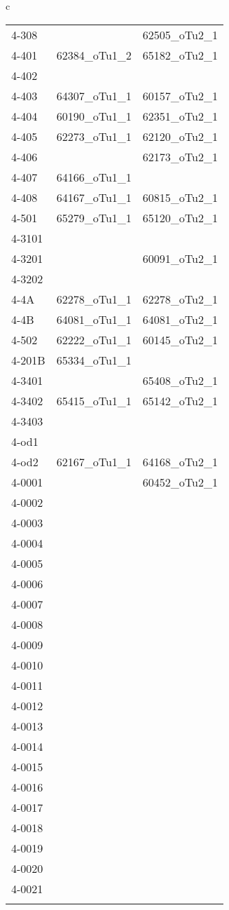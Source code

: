 \begin{table}[htbp]
\begin{center}
\begin{tabular}{c}
{{\begin{minipage}{0.5\hsize}
\begin{center}
\begin{tabular}{lcc}
   4-308 &   & 62505\_oTu2\_1 \\
   4-401 & 62384\_oTu1\_2 & 65182\_oTu2\_1 \\
   4-402 &   &   \\
   4-403 & 64307\_oTu1\_1 & 60157\_oTu2\_1 \\
   4-404 & 60190\_oTu1\_1 & 62351\_oTu2\_1 \\
   4-405 & 62273\_oTu1\_1 & 62120\_oTu2\_1 \\
   4-406 &   & 62173\_oTu2\_1 \\
   4-407 & 64166\_oTu1\_1 &   \\
   4-408 & 64167\_oTu1\_1 & 60815\_oTu2\_1 \\
   4-501 & 65279\_oTu1\_1 & 65120\_oTu2\_1 \\
   4-3101 &   &   \\
   4-3201 &   & 60091\_oTu2\_1 \\
   4-3202 &   &   \\
   4-4A & 62278\_oTu1\_1 & 62278\_oTu2\_1 \\
   4-4B & 64081\_oTu1\_1 & 64081\_oTu2\_1 \\
   4-502 & 62222\_oTu1\_1 & 60145\_oTu2\_1 \\
   4-201B & 65334\_oTu1\_1 &   \\
   4-3401 &   & 65408\_oTu2\_1 \\
   4-3402 & 65415\_oTu1\_1 & 65142\_oTu2\_1 \\
   4-3403 &   &   \\
   4-od1 &   &   \\
   4-od2 & 62167\_oTu1\_1 & 64168\_oTu2\_1 \\
   4-0001 &   & 60452\_oTu2\_1 \\
\if0
   4-0002 &   &   \\
   4-0003 &   &   \\
   4-0004 &   &   \\
   4-0005 &   &   \\
   4-0006 &   &   \\
   4-0007 &   &   \\
   4-0008 &   &   \\
   4-0009 &   &   \\
   4-0010 &   &   \\
   4-0011 &   &   \\
   4-0012 &   &   \\
   4-0013 &   &   \\
   4-0014 &   &   \\
   4-0015 &   &   \\
   4-0016 &   &   \\
   4-0017 &   &   \\
   4-0018 &   &   \\
   4-0019 &   &   \\
   4-0020 &   &   \\
   4-0021 &   &   \\
\fi
   \hline
  \end{tabular}
 \end{center}
\end{minipage}


}}
\end{tabular}
\end{center}
\end{table}
